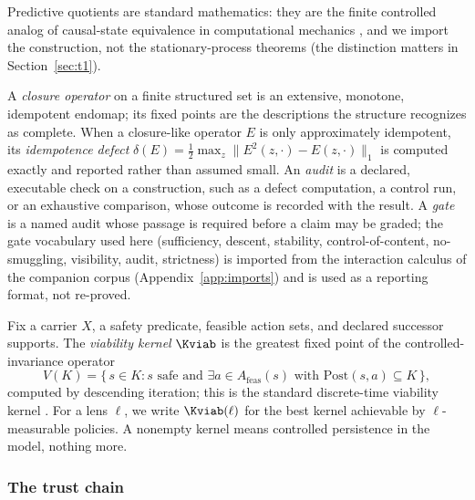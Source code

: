 Predictive quotients are standard mathematics: they are the finite controlled
analog of causal-state equivalence in computational mechanics
\citep{CrutchfieldYoung1989, ShaliziCrutchfield2001}, and we import the
construction, not the stationary-process theorems (the distinction matters in
Section~\ref{sec:t1}).

\begin{definition}
A \emph{closure operator} on a finite structured set is an extensive, monotone,
idempotent endomap; its fixed points are the descriptions the structure
recognizes as complete. When a closure-like operator $E$ is only approximately
idempotent, its \emph{idempotence defect} $\delta(E)=\tfrac12\max_z
\lVert E^2(z,\cdot)-E(z,\cdot)\rVert_1$ is computed exactly and reported rather
than assumed small. An \emph{audit} is a declared, executable check on a
construction, such as a defect computation, a control run, or an exhaustive
comparison, whose outcome is recorded with the result. A \emph{gate} is a named audit
whose passage is required before a claim may be graded; the gate vocabulary
used here (sufficiency, descent, stability, control-of-content, no-smuggling,
visibility, audit, strictness) is imported from the interaction calculus of
the companion corpus (Appendix~\ref{app:imports}) and is used as a reporting
format, not re-proved.
\end{definition}

\begin{definition}
Fix a carrier $X$, a safety predicate, feasible action sets, and declared
successor supports. The \emph{viability kernel} $\Kviab$ is the greatest fixed
point of the controlled-invariance operator
\[
V(K) = \{\, s \in K : s \text{ safe and } \exists a \in A_{\mathrm{feas}}(s)
\text{ with } \mathrm{Post}(s,a) \subseteq K \,\},
\]
computed by descending iteration; this is the standard discrete-time viability
kernel \citep{AnayaEtAl2009Viability, AubinBayenSaintPierre2011}. For a lens
$\ell$, we write $\Kviab(\ell)$ for the best kernel achievable by
$\ell$-measurable policies. A nonempty kernel means controlled persistence in
the model, nothing more.
\end{definition}

\subsubsection*{The trust chain}

